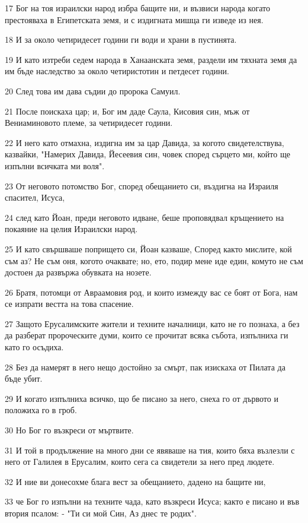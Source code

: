 \par 17 Бог на тоя израилски народ избра бащите ни, и възвиси народа когато престояваха в Египетската земя, и с издигната мишца ги изведе из нея.
\par 18 И за около четиридесет години ги води и храни в пустинята.
\par 19 И като изтреби седем народа в Ханаанската земя, раздели им тяхната земя да им бъде наследство за около четиристотин и петдесет години.
\par 20 След това им дава съдии до пророка Самуил.
\par 21 После поискаха цар; и, Бог им даде Саула, Кисовия син, мъж от Вениаминовото племе, за четиридесет години.
\par 22 И него като отмахна, издигна им за цар Давида, за когото свидетелствува, казвайки, "Намерих Давида, Йесеевия син, човек според сърцето ми, който ще изпълни всичката ми воля".
\par 23 От неговото потомство Бог, според обещанието си, въздигна на Израиля спасител, Исуса,
\par 24 след като Йоан, преди неговото идване, беше проповядвал кръщението на покаяние на целия Израилски народ.
\par 25 И като свършваше попрището си, Йоан казваше, Според както мислите, кой съм аз? Не съм оня, когото очаквате; но, ето, подир мене иде един, комуто не съм достоен да развържа обувката на нозете.
\par 26 Братя, потомци от Авраамовия род, и които измежду вас се боят от Бога, нам се изпрати вестта на това спасение.
\par 27 Защото Ерусалимските жители и техните началници, като не го познаха, а без да разберат пророческите думи, които се прочитат всяка събота, изпълниха ги като го осъдиха.
\par 28 Без да намерят в него нещо достойно за смърт, пак изискаха от Пилата да бъде убит.
\par 29 И когато изпълниха всичко, що бе писано за него, снеха го от дървото и положиха го в гроб.
\par 30 Но Бог го възкреси от мъртвите.
\par 31 И той в продължение на много дни се явяваше на тия, които бяха възлезли с него от Галилея в Ерусалим, които сега са свидетели за него пред людете.
\par 32 И ние ви донесохме блага вест за обещанието, дадено на бащите ни,
\par 33 че Бог го изпълни на техните чада, като възкреси Исуса; както е писано и във втория псалом: - "Ти си мой Син, Аз днес те родих".
